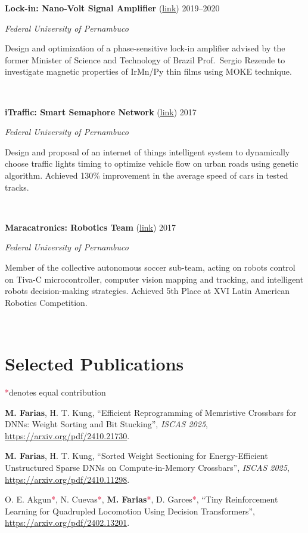 \documentclass[letterpaper,10pt]{article}
\newcommand{\entry}[4]{

\begin{minipage}[t]{.15\textwidth}
\end{minipage}
\hfill\vline\hfill 
\begin{minipage}[t]{0.95\textwidth}
#2 \hfill \textsc{#1}

\textit{#3}

\footnotesize{#4}
\end{minipage}\\\vspace{.25cm}}
\newcommand{\ufpe}{Federal University of Pernambuco}
\newcommand{\co}{\textcolor{crimson}{*}}
\begin{document}
\entry{2019--2020}{\textbf{Lock-in: Nano-Volt Signal Amplifier} (\href{https://www.matheussfarias.com/lockin.html}{link})}{\ufpe}{
	Design and optimization of a phase-sensitive lock-in amplifier advised by the former Minister of Science and Technology of Brazil Prof.\ Sergio Rezende to investigate magnetic properties of IrMn/Py thin films using MOKE technique.
}

\entry{2017}{\textbf{iTraffic: Smart Semaphore Network} (\href{https://www.matheussfarias.com/itraffic.html}{link})}{\ufpe}{
	Design and proposal of an internet of things intelligent system to dynamically choose traffic lights timing to optimize vehicle flow on urban roads using genetic algorithm. Achieved 130\% improvement in the average speed of cars in tested tracks.
}

\entry{2017}{\textbf{Maracatronics: Robotics Team} (\href{https://www.matheussfarias.com/maracatronics.html}{link})}{\ufpe}{
	Member of the collective autonomous soccer sub-team, acting on robots control on Tiva-C microcontroller, computer vision mapping and tracking, and intelligent robots decision-making strategies. Achieved 5th Place at XVI Latin American Robotics Competition.
}

\vspace*{-.25cm}

\section{Selected Publications}
\co denotes equal contribution
\vspace*{.1cm}
\begin{etaremune}
	\renewcommand{\labelenumi}{[\theenumi]}
    \item \textbf{M. Farias}, H. T. Kung, ``Efficient Reprogramming of Memristive Crossbars for DNNs: Weight Sorting and Bit Stucking'', \textit{ISCAS 2025}, \href{https://arxiv.org/pdf/2410.21730}{https://arxiv.org/pdf/2410.21730}.
    \item \textbf{M. Farias}, H. T. Kung, ``Sorted Weight Sectioning for Energy-Efficient Unstructured Sparse DNNs on Compute-in-Memory Crossbars'', \textit{ISCAS 2025}, \href{https://arxiv.org/pdf/2410.11298}{https://arxiv.org/pdf/2410.11298}.
	\item O. E. Akgun\co, N. Cuevas\co, \textbf{M. Farias}\co, D. Garces\co, ``Tiny Reinforcement Learning for Quadrupled Locomotion Using Decision Transformers'', \href{https://arxiv.org/pdf/2402.13201}{https://arxiv.org/pdf/2402.13201}.
\end{etaremune}
\vspace*{-.25cm}
\end{document}
